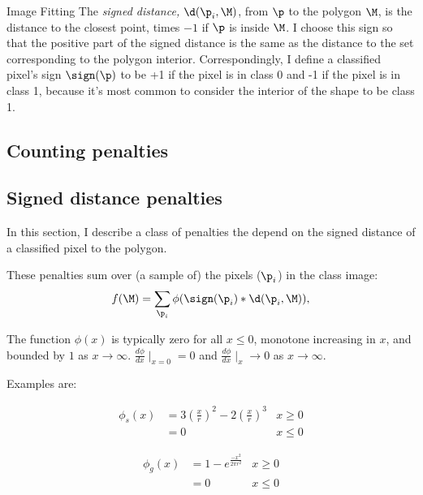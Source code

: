 \begin{plSection}{Image Fitting}
The {\em signed distance,} $\d(\p_i,\M)$, from $\p$ to the polygon $\M$,
is the distance to the closest point, times $-1$ if $\p$ is inside $\M$.
I choose this sign so that the positive part of the signed distance
is the same as the distance to the set corresponding to the polygon interior.
Correspondingly, I define a classified pixel's sign $\sign(\p)$ to be +1
if the pixel is in class 0 and -1 if the pixel is in class 1,
because it's most common to consider the interior of the shape
to be class 1.


\subsection{Counting penalties}
\label{sec:counting-penalties}


\subsection{Signed distance penalties}
\label{sec:signed-distance-penalties}

In this section, I describe a class of penalties the depend on the
signed distance of a classified pixel to the polygon.

These penalties sum over (a sample of) the pixels ($\p_i$) in the class image:
\begin{equation}
f(\M) = \sum_{\p_i} \phi( \sign(\p_i) \ast \d(\p_i,\M) ) ,
\end{equation}

The function $\phi(x)$ is typically zero for all $x \le 0$,
monotone increasing in $x$, and bounded by $1$ as $x\rightarrow\infty$.
$\frac{d\phi}{dx}\mid_{x=0} = 0$ and $\frac{d\phi}{dx}\mid_{x} \rightarrow 0$
as $x\rightarrow\infty$.

Examples are:

\begin{eqnarray}
\phi_s(x) & = 3 \left(\frac{x}{r}\right)^2 - 2 \left(\frac{x}{r}\right)^3 & {x \geq 0} \\
          & = 0 & {x \leq 0}
\end{eqnarray}

\begin{eqnarray}
\phi_g(x) & = 1 - e^{ \frac{-x^2}{2\pi r^2} } & x \geq 0 \\
          & = 0                               & x \leq 0 \nonumber
\end{eqnarray}
\end{plSection}%
